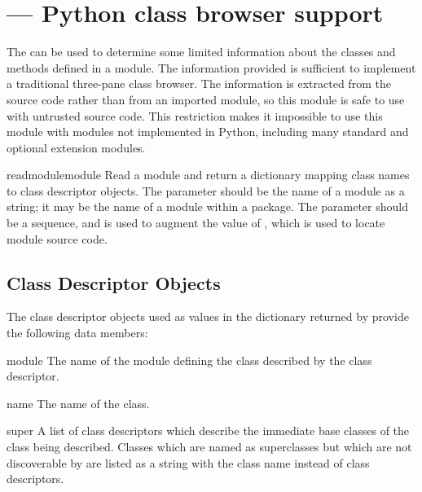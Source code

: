\section{ ---
         Python class browser support}



The  can be used to determine some limited information
about the classes and methods defined in a module.  The information
provided is sufficient to implement a traditional three-pane class
browser.  The information is extracted from the source code rather
than from an imported module, so this module is safe to use with
untrusted source code.  This restriction makes it impossible to use
this module with modules not implemented in Python, including many
standard and optional extension modules.


\begin{funcdesc}{readmodule}{module}
  Read a module and return a dictionary mapping class names to class
  descriptor objects.  The parameter  should be the name
  of a module as a string; it may be the name of a module within a
  package.  The  parameter should be a sequence, and is used
  to augment the value of , which is used to locate
  module source code.
\end{funcdesc}


\subsection{Class Descriptor Objects \label{pyclbr-class-objects}}

The class descriptor objects used as values in the dictionary returned
by  provide the following data members:


\begin{memberdesc}{module}
  The name of the module defining the class described by the class
  descriptor.
\end{memberdesc}

\begin{memberdesc}{name}
  The name of the class.
\end{memberdesc}

\begin{memberdesc}{super}
  A list of class descriptors which describe the immediate base
  classes of the class being described.  Classes which are named as
  superclasses but which are not discoverable by
   are listed as a string with the class name
  instead of class descriptors.
\end{memberdesc}

